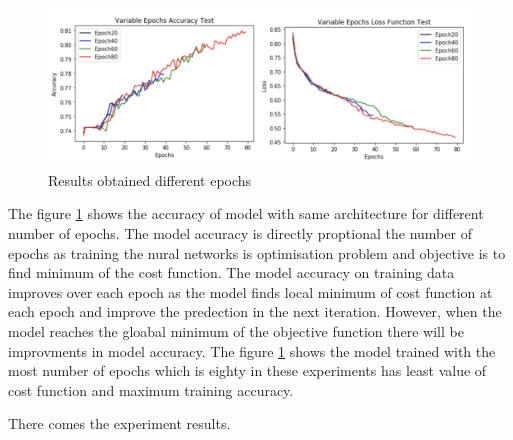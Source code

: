 \begin{figure}[!htp]
    \includegraphics[width=\textwidth]{Images/epochs.png}
    \caption{Results obtained different epochs}
    \label{fig:epochsTest}
\end{figure}

The figure \ref{fig:epochsTest} shows the accuracy of model with same architecture for 
different number of epochs. The model accuracy is directly proptional the number of epochs as 
training the nural networks is optimisation problem and objective is to find minimum of the cost 
function. The model accuracy on training data improves over each epoch as the model finds 
local minimum of cost function at each epoch and improve the predection in the next iteration.
However, when the model reaches the gloabal minimum of the objective function there will 
be improvments in model accuracy. The figure \ref{fig:epochsTest} shows the model trained 
with the most number of epochs which is eighty in these experiments has least value of 
cost function and maximum training accuracy.

\pagebreak

There comes the experiment results.